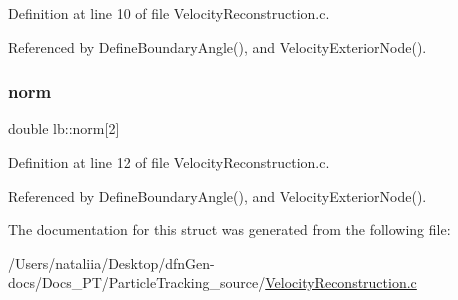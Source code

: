 Definition at line 10 of file Velocity\+Reconstruction.\+c.



Referenced by Define\+Boundary\+Angle(), and Velocity\+Exterior\+Node().

\mbox{\label{structlb_a661e852334d1c5f1c8552b1eb2f06db8}} 
\subsubsection{\texorpdfstring{norm}{norm}}
{\footnotesize\ttfamily double lb\+::norm\mbox{[}2\mbox{]}}



Definition at line 12 of file Velocity\+Reconstruction.\+c.



Referenced by Define\+Boundary\+Angle(), and Velocity\+Exterior\+Node().



The documentation for this struct was generated from the following file\+:\begin{DoxyCompactItemize}
\item 
/\+Users/nataliia/\+Desktop/dfn\+Gen-\/docs/\+Docs\+\_\+\+P\+T/\+Particle\+Tracking\+\_\+source/\mbox{\hyperlink{_velocity_reconstruction_8c}{Velocity\+Reconstruction.\+c}}\end{DoxyCompactItemize}
